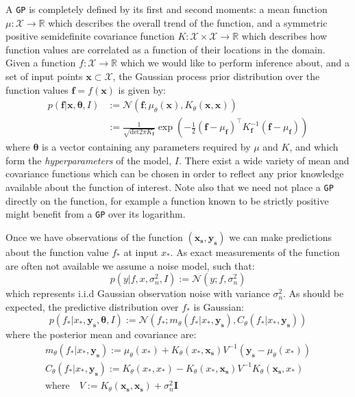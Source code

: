 \documentclass{article}
\begin{document}
A \verb"GP" is completely defined by its first and second moments: a mean function $\mu : \mathcal{X} \rightarrow \mathbb{R}$ which describes the overall trend of the function, and a symmetric positive semidefinite covariance function $K : \mathcal{X} \times \mathcal{X} \rightarrow \mathbb{R}$ which describes how function values are correlated as a function of their locations in the domain. Given a function $f : \mathcal{X} \rightarrow \mathbb{R}$ which we would like to perform inference about, and a set of input points $\mathbf{x} \subset \mathcal{X}$, the Gaussian process prior distribution over the function values $\mathbf{f} = f(\mathbf{x})$ is given by:
\begin{align}
p(\mathbf{f} | \mathbf{x},\bm{\theta},I) &:= \mathcal{N}\left( \mathbf{f};\mu_\theta(\mathbf{x}),K_\theta(\mathbf{x},\mathbf{x}) \right) \\
&:= \frac{1}{\sqrt{\mathrm{det} 2 \pi K_{\mathbf{f}}} } \exp \left( - \frac{1}{2} (\mathbf{f}-\mu_{\mathbf{f}})^\top K_\mathbf{f}^{-1} (\mathbf{f}-\mu_{\mathbf{f}})  \right)
\end{align}
where $\bm{\theta}$ is a vector containing any parameters required by $\mu$ and $K$, and which form the \emph{hyperparameters} of the model, $I$. %
There exist a wide variety of mean and covariance functions which can be chosen in order to reflect any prior knowledge available about the function of interest. Note also that we need not place a \verb"GP" directly on the function, for example a function known to be strictly positive might benefit from a \verb"GP" over its logarithm.

Once we have observations of the function $(\mathbf{x_s},\mathbf{y_s})$ we can make predictions about the function value $f_*$ at input $x_*$. As exact measurements of the function are often not available we assume a noise model, such that:
\begin{equation}
p(y | f, x, \sigma_n^2,I) := \mathcal{N}(y; f, \sigma_n^2)
\end{equation} 
which represents i.i.d Gaussian observation noise with variance $\sigma_n^2$. As should be expected, the predictive distribution over $f_*$ is Gaussian:
\begin{equation}\label{obsnoise}
p(f_* | x_*, \mathbf{y_s},\bm{\theta},I) := \mathcal{N} ( f_* ; m_\theta(f_* | x_*, \mathbf{y_s}), C_\theta(f_* | x_*, \mathbf{y_s}))
\end{equation}
where the posterior mean and covariance are:
\begin{align}
m_\theta(f_* | x_*, \mathbf{y_s}) := \mu_\theta(x_*) + K_\theta(x_*,\mathbf{x_s})V^{-1}(\mathbf{y_s} - \mu_\theta(x_*))\\
C_\theta(f_* | x_*, \mathbf{y_s}) := K_\theta(x_*,x_*) - K_\theta(x_*,\mathbf{x_s})V^{-1}K_\theta(\mathbf{x_s},x_*)\\
\mathrm{where}\quad V := K_\theta(\mathbf{x_s},\mathbf{x_s}) + \sigma_n^2\mathbf{I}
\end{align}
\end{document}
